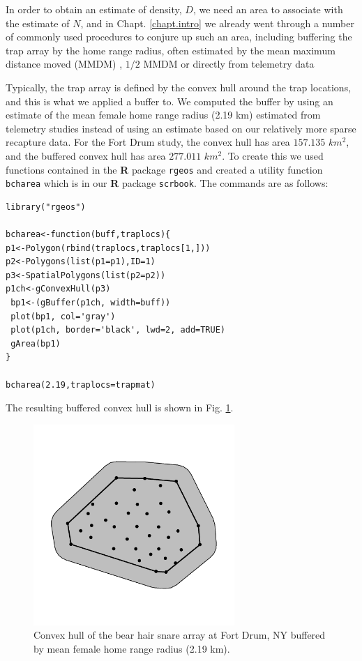 In order to obtain an estimate of density, $D$, we need an area to
associate with the estimate of $N$, and in Chapt.  \ref{chapt.intro}
we already went through a number of commonly used procedures to
conjure up such an area, including buffering the trap array by the
home range radius, often estimated by the mean maximum distance moved
(MMDM) \citep{parmenter_etal:2003}, $1/2$ MMDM \citep{dice:1938} or
directly from telemetry data \citep{wallace_etal:2003}

Typically, the trap array is defined by the convex hull around the
trap locations, and this is what we applied a buffer to. We computed
the buffer by using an estimate of the mean female home range radius
(2.19 km) estimated from telemetry studies \citep{bales_etal:2005}
instead of using an estimate based on our relatively more sparse
recapture data.  For the Fort Drum study, the convex hull has area
$157.135$ $km^2$, and the buffered convex hull has area $277.011$
$km^2$.  To create this we used functions contained in the {\bf R}
package \mbox{\tt rgeos} and created a utility function \mbox{\tt
  bcharea} which is in our {\bf R} package \mbox{\tt scrbook}. The
commands are as follows:
\begin{verbatim}
library("rgeos")

bcharea<-function(buff,traplocs){
p1<-Polygon(rbind(traplocs,traplocs[1,]))
p2<-Polygons(list(p1=p1),ID=1)
p3<-SpatialPolygons(list(p2=p2))
p1ch<-gConvexHull(p3)
 bp1<-(gBuffer(p1ch, width=buff))
 plot(bp1, col='gray')
 plot(p1ch, border='black', lwd=2, add=TRUE)
 gArea(bp1)
}

bcharea(2.19,traplocs=trapmat)
\end{verbatim}
The resulting buffered convex hull is shown in Fig. \ref{closed.fig.bch}.
\begin{figure}
\begin{center}
\includegraphics[height=3in,width=3in]{Ch3/figs/bufferedCH}
\end{center}
\caption{Convex hull of the bear hair snare array at Fort Drum, NY buffered by mean female
home range radius (2.19 km).}
\label{closed.fig.bch}
\end{figure}

